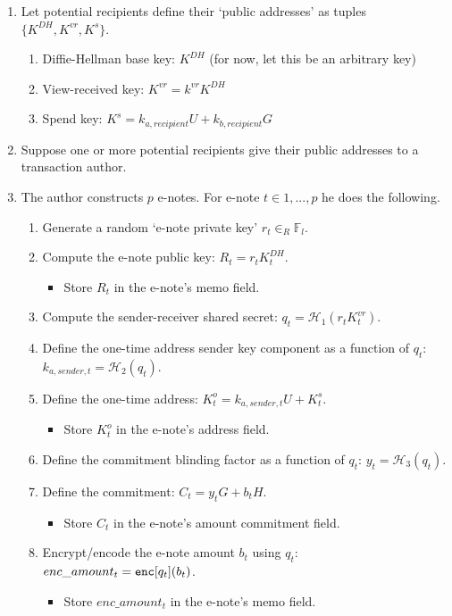 \begin{enumerate}
    \item Let potential recipients define their `public addresses' as tuples $\{K^{DH}, K^{vr}, K^s\}$.
    \begin{enumerate}
        \item Diffie-Hellman base key: $K^{DH}$ (for now, let this be an arbitrary key)
        \item View-received key: $K^{vr} = k^{vr} K^{DH}$
        \item Spend key: $K^s = k_{a,recipient} U + k_{b,recipient} G$
    \end{enumerate}

    \item Suppose one or more potential recipients give their public addresses to a transaction author.

    \item The author constructs $p$ e-notes. For e-note $t \in 1,...,p$ he does the following.
    \begin{enumerate}
        \item Generate a random `e-note private key' $r_t \in_R \mathbb{F}_l$.
        \item Compute the e-note public key: $R_t = r_t K^{DH}_t$.
        \begin{itemize}
            \item Store $R_t$ in the e-note's memo field.
        \end{itemize}
        \item Compute the sender-receiver shared secret: $q_t = \mathcal{H}_1(r_t K^{vr}_t)$.
        \item Define the one-time address sender key component as a function of $q_t$: $k_{a,sender,t} = \mathcal{H}_2(q_t)$.
        \item Define the one-time address: $K^o_t = k_{a,sender,t} U + K^s_t$.
        \begin{itemize}
            \item Store $K^o_t$ in the e-note's address field.
        \end{itemize}
        \item Define the commitment blinding factor as a function of $q_t$: $y_t = \mathcal{H}_3(q_t)$.
        \item Define the commitment: $C_t = y_t G + b_t H$.
        \begin{itemize}
            \item Store $C_t$ in the e-note's amount commitment field.
        \end{itemize}
        \item Encrypt/encode the e-note amount $b_t$ using $q_t$: $enc\_amount_t = \textrm{\tt enc}[q_t](b_t)$.
        \begin{itemize}
            \item Store $enc\_amount_t$ in the e-note's memo field.
        \end{itemize}
    \end{enumerate}


\end{enumerate}
